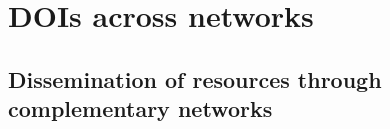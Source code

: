 \documentclass[11pt,a4paper]{ivoa}
\begin{document}




\section{DOIs across networks}\hypertarget{dois-across-networks}{}\label{dois-across-networks}

\subsection{Dissemination of resources through complementary networks}\hypertarget{dissemination-of-resources-through-complementary-networks}{}\label{dissemination-of-resources-through-complementary-networks}
\end{document}
